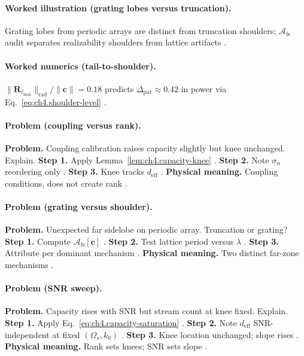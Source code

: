 \paragraph{Worked illustration (grating lobes versus truncation).}
Grating lobes from periodic arrays are distinct from truncation shoulders; \(\mathcal{A}_{\mathrm{fs}}\) audit separates realizability shoulders from lattice artifacts
\cite{hansen1988,stratton1941,harrington2001,jackson1999,devaney2004}.

\paragraph{Worked numerics (tail-to-shoulder).}
\(\|\mathbf{R}_{\ell_{\max}}\|_{\mathrm{rad}}/\|\mathbf{c}\|=0.18\) predicts \(\Delta_{\mathrm{pat}}\approx0.42\) in power via Eq.~\eqref{eq:ch4.shoulder-level}
\cite{hansen1988,harrington2001,stratton1941,devaney2004,collin2001}.

\paragraph{Problem (coupling versus rank).}
\textbf{Problem.} Coupling calibration raises capacity slightly but knee unchanged. Explain.
\textbf{Step 1.} Apply Lemma~\ref{lem:ch4.capacity-knee} \cite{harrington2001,devaney2004}.
\textbf{Step 2.} Note \(\sigma_{n}\) reordering only \cite{hansen1988,stratton1941}.
\textbf{Step 3.} Knee tracks \(d_{\mathrm{eff}}\) \cite{jackson1999,collin2001}.
\textbf{Physical meaning.} Coupling conditions, does not create rank \cite{harrington2001}.

\paragraph{Problem (grating versus shoulder).}
\textbf{Problem.} Unexpected far sidelobe on periodic array. Truncation or grating?
\textbf{Step 1.} Compute \(\mathcal{A}_{\mathrm{fs}}[\mathbf{c}]\) \cite{hansen1988,stratton1941}.
\textbf{Step 2.} Test lattice period versus \(\lambda\) \cite{harrington2001,collin2001}.
\textbf{Step 3.} Attribute per dominant mechanism \cite{devaney2004,jackson1999}.
\textbf{Physical meaning.} Two distinct far-zone mechanisms \cite{stratton1941}.

\paragraph{Problem (SNR sweep).}
\textbf{Problem.} Capacity rises with SNR but stream count at knee fixed. Explain.
\textbf{Step 1.} Apply Eq.~\eqref{eq:ch4.capacity-saturation} \cite{harrington2001,devaney2004}.
\textbf{Step 2.} Note \(d_{\mathrm{eff}}\) SNR-independent at fixed \((\Omega_{s},k_{0})\) \cite{hansen1988,stratton1941}.
\textbf{Step 3.} Knee location unchanged; slope rises \cite{jackson1999,collin2001}.
\textbf{Physical meaning.} Rank sets knees; SNR sets slope \cite{harrington2001}.

